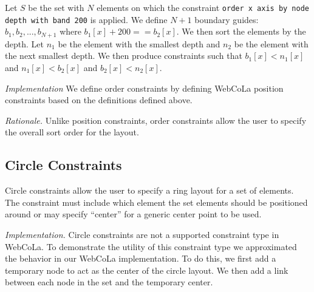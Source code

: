 \begin{definition}
Let $S$ be the set with $N$ elements on which the constraint 
\texttt{order x axis by node depth with band 200} is applied.
We define $N+1$ boundary guides: $b_1, b_2, ..., b_{N+1}$ where
$b_1[x] + 200 == b_2[x]$. We then sort the elements by the depth.
Let $n_1$ be the element with the smallest depth and $n_2$ be the element 
with the next smallest depth. We then produce constraints such that
$b_1[x] < n_1[x]$ and $n_1[x] < b_2[x]$ and $b_2[x] < n_2[x]$.
\end{definition}

\emph{Implementation}
We define order constraints by defining WebCoLa position constraints based
on the definitions defined above. 


\emph{Rationale.} Unlike position constraints, order constraints allow the
user to specify the overall sort order for the layout.

\subsection{Circle Constraints}
Circle constraints allow the user to specify a ring layout for a set of
elements. The constraint must include which element the set elements should
be positioned around or may specify ``center'' for a generic center point
to be used.



\emph{Implementation.}
Circle constraints are not a supported constraint type in WebCoLa. To 
demonstrate the utility of this constraint type we approximated the behavior
in our WebCoLa implementation. To do this, we first add a temporary node
to act as the center of the circle layout. We then add a link between each 
node in the set and the temporary center. 


